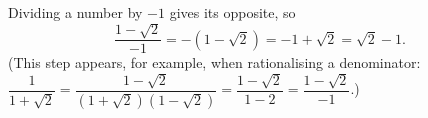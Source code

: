 Dividing a number by $-1$ gives its opposite, so
\[\dfrac{1-\sqrt2}{-1}=-\left(1-\sqrt2\right)=-1+\sqrt2=\boxed{\sqrt2-1}.\]
(This step appears, for example, when rationalising a denominator: $\dfrac{1}{1+\sqrt2}=\dfrac{1-\sqrt2}{\left(1+\sqrt2\right)\left(1-\sqrt2\right)}=\dfrac{1-\sqrt2}{1-2}=\dfrac{1-\sqrt2}{-1}$.)
